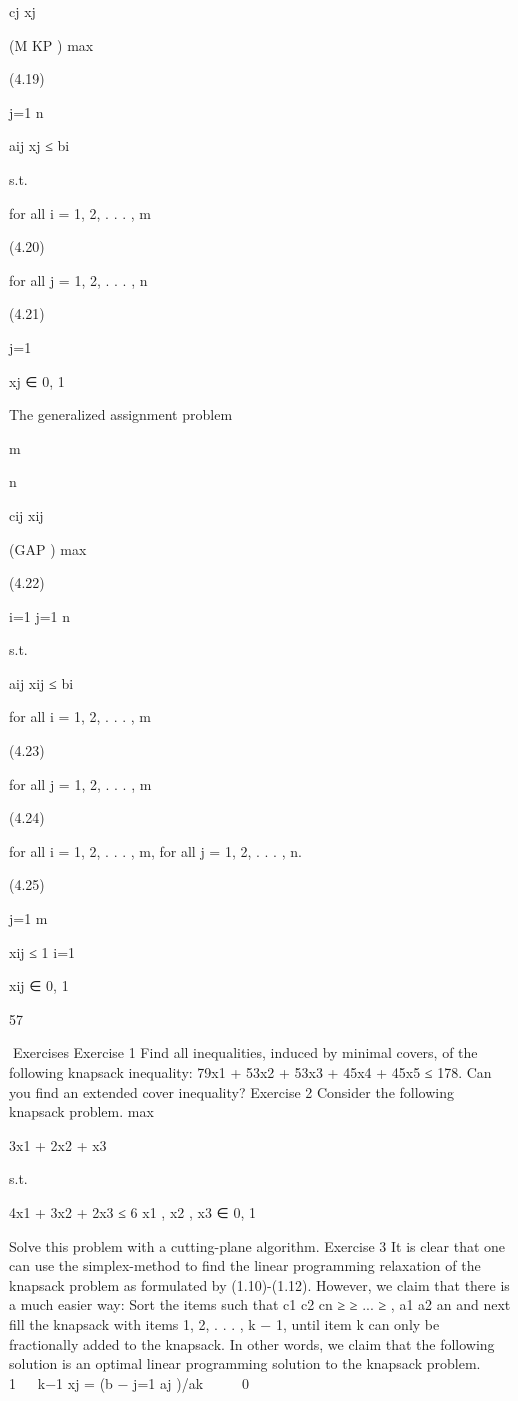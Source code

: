 \documentclass[titlepage]{book}
\theoremstyle{plain}
\theoremstyle{definition}
\theoremstyle{remark}
\begin{document}
cj xj

(M KP ) max

(4.19)

j=1
n

aij xj ≤ bi

s.t.

for all i = 1, 2, . . . , m

(4.20)

for all j = 1, 2, . . . , n

(4.21)

j=1

xj ∈ {0, 1}

The generalized assignment problem

m

n

cij xij

(GAP ) max

(4.22)

i=1 j=1
n

s.t.

aij xij ≤ bi

for all i = 1, 2, . . . , m

(4.23)

for all j = 1, 2, . . . , m

(4.24)

for all i = 1, 2, . . . , m, for all j = 1, 2, . . . , n.

(4.25)

j=1
m

xij ≤ 1
i=1

xij ∈ {0, 1}

57

Exercises
Exercise 1
Find all inequalities, induced by minimal covers, of the following knapsack inequality:
79x1 + 53x2 + 53x3 + 45x4 + 45x5 ≤ 178.
Can you find an extended cover inequality?
Exercise 2
Consider the following knapsack problem.
max

3x1 + 2x2 + x3

s.t.

4x1 + 3x2 + 2x3 ≤ 6
x1 , x2 , x3 ∈ {0, 1}

Solve this problem with a cutting-plane algorithm.
Exercise 3
It is clear that one can use the simplex-method to find the linear programming relaxation of the knapsack
problem as formulated by (1.10)-(1.12). However, we claim that there is a much easier way:
Sort the items such that
c1
c2
cn
≥
≥ ... ≥
,
a1
a2
an
and next fill the knapsack with items 1, 2, . . . , k − 1, until item k can only be fractionally added to the
knapsack. In other words, we claim that the following solution is an optimal linear programming solution
to the knapsack problem.



1


k−1
xj =
(b − j=1 aj )/ak



 0
\end{document}
